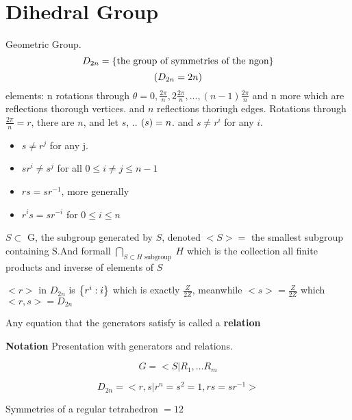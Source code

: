 \section{Dihedral Group}
Geometric Group.
\[ D_{2n} = \left\lbrace \textrm{the group of symmetries of the ngon} \right\rbrace \]
\[ \left( D_{2n} = 2n \right) \]
elements: n rotations through $ \theta = 0, \frac{2 \pi}{n}, 2 \frac{2 \pi}{n}, ..., (n-1) \frac{2 \pi }{n}$
 and n more which are reflections thorough vertices. and $n$ reflections thoriugh edges.
 Rotations through  $ \frac{2\pi}{n} = r $, there are $n$, and let $s$, ..  $ \left( s \right) = n $. and $ s \neq r^i $ for any $i$.
 \begin{itemize}
 	\item $ s \neq r^j $ for any j.
 	\item $ s r^{i} \neq s^j $ for all $ 0 \leq i \neq j \leq n-1$
 	\item  $ rs = s r^{-1} $, more generally
 	\item $ r^i s = s r^{-i} $ for $ 0 \leq i \leq n$	
 \end{itemize}
 
 
 \begin{define}
 	$S \subset $ G, the subgroup generated by $S$, denoted $ < S > = $ the smallest subgroup containing S.And formall $ \bigcap_{S \subset H \textrm{ subgroup } } H $ which is the collection all finite products and inverse of elements of $S$
 \end{define}
 
 \begin{example}
 $ <r> $ in $D_{2n} $ is $ \left\lbrace r^i: i \right\rbrace $ which is exactly $ \frac{Z}{2 Z} $, meanwhile $ <s> = \frac{Z}{2Z} $ which $ <r,s> = D_{2n} $ 
 \end{example}
 
 Any equation that the generators satisfy is called a \textbf{relation}
 
 \textbf{Notation} Presentation with generators and relations.
 
 \[  G = <S | R_1, \ldots R_m \]
 
 \begin{example}
 	\[ D_{2n} = < r,s | r^n = s^2 =1, rs = sr^{-1} > \]
 \end{example}
 
 \begin{example}
Symmetries of a regular tetrahedron $ = 12 $ 
 \end{example}
 
